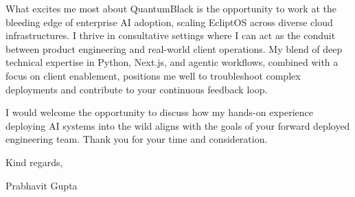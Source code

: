 \documentclass[11pt,a4paper]{article}
\begin{document}
What excites me most about QuantumBlack is the opportunity to work at the bleeding edge of enterprise AI adoption, scaling EcliptOS across diverse cloud infrastructures. I thrive in consultative settings where I can act as the conduit between product engineering and real-world client operations. My blend of deep technical expertise in Python, Next.js, and agentic workflows, combined with a focus on client enablement, positions me well to troubleshoot complex deployments and contribute to your continuous feedback loop.

I would welcome the opportunity to discuss how my hands-on experience deploying AI systems into the wild aligns with the goals of your forward deployed engineering team. Thank you for your time and consideration.

\vspace{1em}

Kind regards,

\vspace{1em}

Prabhavit Gupta
\end{document}
